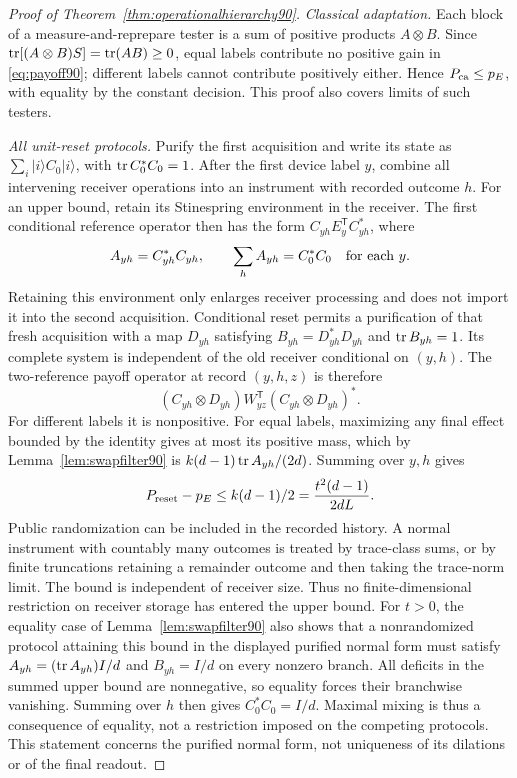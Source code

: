 \begin{proof}[Proof of Theorem~\ref{thm:operationalhierarchy90}]
\emph{Classical adaptation.}
Each block of a measure-and-reprepare tester is a sum of positive
products $A\otimes B$.  Since
$\operatorname{tr}[(A\otimes B)S]=\operatorname{tr}(AB)\ge0$, equal labels contribute no positive
gain in \eqref{eq:payoff90}; different labels cannot contribute positively
either.  Hence $P_{\rm ca}\le p_E$, with equality by the constant decision.
This proof also covers limits of such testers.

\emph{All unit-reset protocols.}
Purify the first acquisition and write its state as
$\sum_i|i\rangle C_0|i\rangle$, with $\operatorname{tr} C_0^*C_0=1$.
After the first device label $y$, combine all intervening receiver
operations into an instrument with recorded outcome $h$.  For an upper
bound, retain its Stinespring environment in the receiver.  The first
conditional reference operator then has the form
$C_{yh}E_y^{\mathsf T}C_{yh}^*$, where
\[
 A_{yh}=C_{yh}^*C_{yh},\qquad
 \sum_h A_{yh}=C_0^*C_0\quad\hbox{for each }y.
\]
Retaining this environment only enlarges receiver processing and does
not import it into the second acquisition.  Conditional reset permits
a purification of that fresh acquisition with a map $D_{yh}$ satisfying
$B_{yh}=D_{yh}^*D_{yh}$ and $\operatorname{tr} B_{yh}=1$.
Its complete system is independent of the old receiver conditional on
$(y,h)$.  The two-reference payoff operator at record $(y,h,z)$ is
therefore
\[
 (C_{yh}\otimes D_{yh})W_{yz}^{\mathsf T}
                         (C_{yh}\otimes D_{yh})^*.
\]
For different labels it is nonpositive.  For equal labels, maximizing
any final effect bounded by the identity gives at most its positive
mass, which by Lemma~\ref{lem:swapfilter90} is
$k(d-1)\operatorname{tr} A_{yh}/(2d)$.  Summing over $y,h$ gives
\[
 P_{\rm reset}-p_E\le k(d-1)/2=\frac{t^2(d-1)}{2dL}.
\]
Public randomization can be included in the recorded history.  A normal
instrument with countably many outcomes is treated by trace-class
sums, or by finite truncations retaining a remainder outcome and then
taking the trace-norm limit.  The bound is independent of receiver
size.  Thus no finite-dimensional restriction on receiver storage has
entered the upper bound.
For $t>0$, the equality case of Lemma~\ref{lem:swapfilter90} also shows
that a nonrandomized protocol attaining this bound in the displayed
purified normal form must satisfy
$A_{yh}=(\operatorname{tr} A_{yh})I/d$ and $B_{yh}=I/d$ on every nonzero branch.
All deficits in the summed upper bound are nonnegative, so equality
forces their branchwise vanishing.  Summing over $h$ then gives
$C_0^*C_0=I/d$.  Maximal mixing is thus a consequence of equality,
not a restriction imposed on the competing protocols.  This statement
concerns the purified normal form, not uniqueness of its dilations
or of the final readout.


\end{proof}

